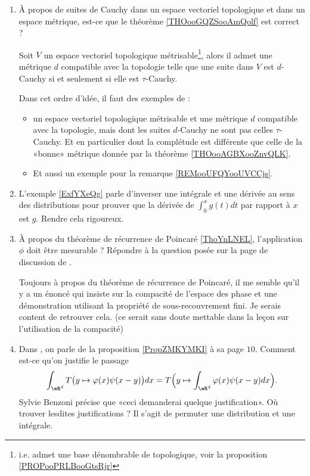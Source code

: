 \begin{enumerate}
    \item
        À propos de suites de Cauchy dans un espace vectoriel topologique et dans un espace métrique, est-ce que le théorème \ref{THOooGQZSooAmQolf} est correct ?

        Soit \( V\) un espace vectoriel topologique métrisable\footnote{i.e. admet une base dénombrable de topologique, voir la proposition \ref{PROPooPRLBooGtsRjr}}, alors il admet une métrique \( d\) compatible avec la topologie telle que une suite dans \( V\) est \( d\)-Cauchy si et seulement si elle est \( \tau\)-Cauchy.

        Dans cet ordre d'idée, il faut des exemples de :
        \begin{itemize}
            \item un espace vectoriel topologique métrisable et une métrique \( d\) compatible avec la topologie, mais dont les suites \( d\)-Cauchy ne sont pas celles \( \tau\)-Cauchy. Et en particulier dont la complétude est différente que celle de la «bonne» métrique donnée par la théorème \ref{THOooAGBXooZnvQLK}.
            \item Et aussi un exemple pour la remarque \ref{REMooUFQYooUVCCjs}.
        \end{itemize}
    \item
        L'exemple \ref{ExfYXeQg} parle d'inverser une intégrale et une dérivée au sens des distributions pour prouver que la dérivée de \( \int_0^xg(t)dt\) par rapport à \( x\) est \( g\). Rendre cela rigoureux.
    \item 
        À propos du théorème de récurrence de Poincaré \ref{ThoYnLNEL}, l'application \( \phi\) doit être mesurable ? Répondre à la question posée sur la page de discussion de .

        Toujours à propos du théorème de récurrence de Poincaré, il me semble qu'il y a un énoncé qui insiste sur la compacité de l'espace des phase et une démonstration utilisant la propriété de sous-recouvrement fini. Je serais content de retrouver cela. (ce serait sans doute mettable dans la leçon sur l'utilisation de la compacité)
        \item 
            Dans \cite{OEVAuEz}, on parle de la proposition \ref{PropZMKYMKI} à sa page \( 10\). Comment est-ce qu'on justifie le passage
            \begin{equation}
                \int_{\eR^d}T\big( y\mapsto \varphi(x)\psi(x-y) \big)dx=T\Big( y\mapsto\int_{\eR^d}\varphi(x)\psi(x-y)dx \Big).
            \end{equation}
            Sylvie Benzoni précise que «ceci demanderai quelque justification». Où trouver lesdites justifications ? Il s'agit de permuter une distribution et une intégrale.


\end{enumerate}
